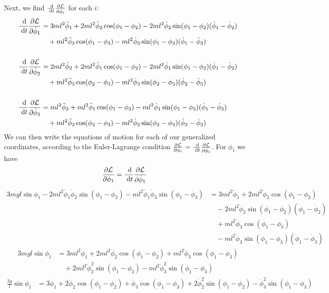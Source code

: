 \documentclass{article}
\renewcommand{\L}{\mathcal{L}}
\begin{document}
\begin{appendices}
\begin{align}
    \end{align}
    Next, we find $\D{}{t}\pD{\L}{\dot\phi_i}$ for each $i$:
    \begin{align}
        \D{}{t}\pD{\L}{\dot\phi_1} &= 3ml^2\ddot\phi_1 
            + 2ml^2\ddot\phi_2\cos(\phi_1-\phi_2) 
            - 2ml^2\dot\phi_2\sin(\phi_1-\phi_2)(\dot\phi_1-\dot\phi_2) \\
            &\quad + ml^2\ddot\phi_3\cos(\phi_1-\phi_3) 
            - ml^2\dot\phi_3\sin(\phi_1-\phi_3)(\dot\phi_1-\dot\phi_3) \\\\
        \D{}{t}\pD{\L}{\dot\phi_2} &= 2ml^2\ddot\phi_2 
            + 2ml^2\ddot\phi_1\cos(\phi_1-\phi_2) 
            - 2ml^2\dot\phi_1\sin(\phi_1-\phi_2)(\dot\phi_1-\dot\phi_2) \\
            &\quad + ml^2\ddot\phi_3\cos(\phi_2-\phi_3) 
            - ml^2\dot\phi_3\sin(\phi_2-\phi_3)(\dot\phi_2-\dot\phi_3) \\\\
        \D{}{t}\pD{\L}{\dot\phi_3} &= ml^2\ddot\phi_3 
            + ml^2\ddot\phi_1\cos(\phi_1-\phi_3) 
            - ml^2\dot\phi_1\sin(\phi_1-\phi_3)(\dot\phi_1-\dot\phi_3) \\
            &\quad + ml^2\ddot\phi_2\cos(\phi_2-\phi_3) 
            - ml^2\dot\phi_2\sin(\phi_2-\phi_3)(\dot\phi_2-\dot\phi_3) 
    \end{align}
    We can then write the equations of motion for each of our generalized
    coordinates, according to the Euler-Lagrange condition $\pD{\L}{\phi_i}
    =\D{}{t}\pD{\L}{\dot\phi_i}$. For $\phi_1$ we have
    \begin{align}
        \pD{\L}{\phi_1} &= \D{}{t}\pD{\L}{\dot\phi_1} 
    \end{align}
    \begin{align}
        3mgl\sin\phi_1 -2ml^2\dot\phi_1\dot\phi_2\sin(\phi_1-\phi_2)
            -ml^2\dot\phi_1\dot\phi_3\sin(\phi_1-\phi_3)
        &= 3ml^2\ddot\phi_1 + 2ml^2\ddot\phi_2\cos(\phi_1-\phi_2) \\
        &\quad - 2ml^2\dot\phi_2\sin(\phi_1-\phi_2)(\dot\phi_1-\dot\phi_2) \\
        &\quad + ml^2\ddot\phi_3\cos(\phi_1-\phi_3) \\
        &\quad - ml^2\dot\phi_3\sin(\phi_1-\phi_3)(\dot\phi_1-\dot\phi_3) 
    \end{align}
    \begin{align}
        3mgl\sin\phi_1 &= 3ml^2\ddot\phi_1 + 2ml^2\ddot\phi_2\cos(\phi_1-\phi_2)
            + ml^2\ddot\phi_3\cos(\phi_1-\phi_3)  \\
            &\quad + 2ml^2\dot\phi_2^2\sin(\phi_1-\phi_2)
            - ml^2\dot\phi_3^2\sin(\phi_1-\phi_3)
    \end{align}
    \begin{align}
        \frac{3g}{l}\sin\phi_1 &= 3\ddot\phi_1 + 2\ddot\phi_2\cos(\phi_1-\phi_2)
            + \ddot\phi_3\cos(\phi_1-\phi_3) + 2\dot\phi_2^2\sin(\phi_1-\phi_2)
            - \dot\phi_3^2\sin(\phi_1-\phi_3)   \label{eq_m1}
    \end{align}


\end{appendices}
\end{document}
